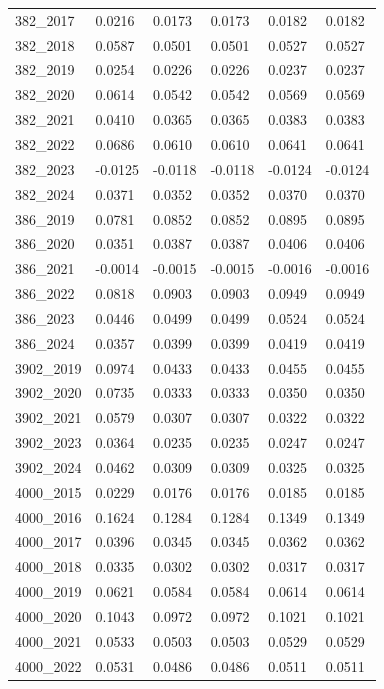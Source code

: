\begin{table}[htbp]
\begin{tabular}{llllll}
382_2017 & 0.0216 & 0.0173 & 0.0173 & 0.0182 & 0.0182 \\
382_2018 & 0.0587 & 0.0501 & 0.0501 & 0.0527 & 0.0527 \\
382_2019 & 0.0254 & 0.0226 & 0.0226 & 0.0237 & 0.0237 \\
382_2020 & 0.0614 & 0.0542 & 0.0542 & 0.0569 & 0.0569 \\
382_2021 & 0.0410 & 0.0365 & 0.0365 & 0.0383 & 0.0383 \\
382_2022 & 0.0686 & 0.0610 & 0.0610 & 0.0641 & 0.0641 \\
382_2023 & -0.0125 & -0.0118 & -0.0118 & -0.0124 & -0.0124 \\
382_2024 & 0.0371 & 0.0352 & 0.0352 & 0.0370 & 0.0370 \\
386_2019 & 0.0781 & 0.0852 & 0.0852 & 0.0895 & 0.0895 \\
386_2020 & 0.0351 & 0.0387 & 0.0387 & 0.0406 & 0.0406 \\
386_2021 & -0.0014 & -0.0015 & -0.0015 & -0.0016 & -0.0016 \\
386_2022 & 0.0818 & 0.0903 & 0.0903 & 0.0949 & 0.0949 \\
386_2023 & 0.0446 & 0.0499 & 0.0499 & 0.0524 & 0.0524 \\
386_2024 & 0.0357 & 0.0399 & 0.0399 & 0.0419 & 0.0419 \\
3902_2019 & 0.0974 & 0.0433 & 0.0433 & 0.0455 & 0.0455 \\
3902_2020 & 0.0735 & 0.0333 & 0.0333 & 0.0350 & 0.0350 \\
3902_2021 & 0.0579 & 0.0307 & 0.0307 & 0.0322 & 0.0322 \\
3902_2023 & 0.0364 & 0.0235 & 0.0235 & 0.0247 & 0.0247 \\
3902_2024 & 0.0462 & 0.0309 & 0.0309 & 0.0325 & 0.0325 \\
4000_2015 & 0.0229 & 0.0176 & 0.0176 & 0.0185 & 0.0185 \\
4000_2016 & 0.1624 & 0.1284 & 0.1284 & 0.1349 & 0.1349 \\
4000_2017 & 0.0396 & 0.0345 & 0.0345 & 0.0362 & 0.0362 \\
4000_2018 & 0.0335 & 0.0302 & 0.0302 & 0.0317 & 0.0317 \\
4000_2019 & 0.0621 & 0.0584 & 0.0584 & 0.0614 & 0.0614 \\
4000_2020 & 0.1043 & 0.0972 & 0.0972 & 0.1021 & 0.1021 \\
4000_2021 & 0.0533 & 0.0503 & 0.0503 & 0.0529 & 0.0529 \\
4000_2022 & 0.0531 & 0.0486 & 0.0486 & 0.0511 & 0.0511 \\

\end{tabular}
\end{table}

